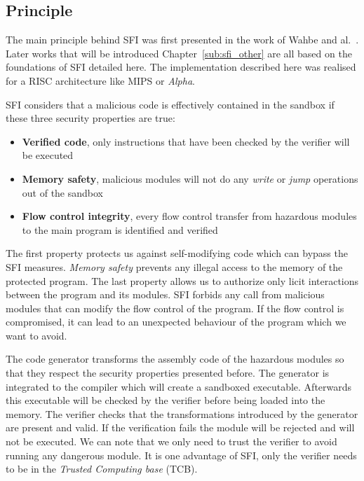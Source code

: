 \documentclass[11pt]{sdm}
\begin{document}
\subsection{Principle}

The main principle behind SFI was first presented in the work of Wahbe and al.~\cite{Wahbe:1993:ESF:173668.168635}.
Later works that will be introduced Chapter~\ref{sub:sfi_other} are all based on the foundations of SFI detailed here.
The implementation described here was realised for a RISC architecture like MIPS or \textit{Alpha}.

SFI considers that a malicious code is effectively contained in the sandbox if these three security properties are true:
\begin{itemize}
	\item \textbf{Verified code}, only instructions that have been checked by the verifier will be executed 
	\item \textbf{Memory safety}, malicious modules will not do any \textit{write} or \textit{jump} operations out of the sandbox
	\item \textbf{Flow control integrity}, every flow control transfer from hazardous modules to the main program is identified and verified
\end{itemize}
The first property protects us against self-modifying code which can bypass the SFI measures. \textit{Memory safety} prevents any illegal access to the memory of the protected program. The last property allows us to authorize only licit interactions between the program and its modules. SFI forbids any call from malicious modules that can modify the flow control of the program. If the flow control is compromised, it can lead to an unexpected behaviour of the program which we want to avoid.

The code generator transforms the assembly code of the hazardous modules so that they respect the security properties presented before. The generator is integrated to the compiler which will create a sandboxed executable. Afterwards this executable will be checked by the verifier before being loaded into the memory. 
The verifier checks that the transformations introduced by the generator are present and valid. 
If the verification fails the module will be rejected and will not be executed. We can note that we only need to trust the verifier to avoid running any dangerous module. 
It is one advantage of SFI, only the verifier needs to be in the \textit{Trusted Computing base} (TCB).
\end{document}
